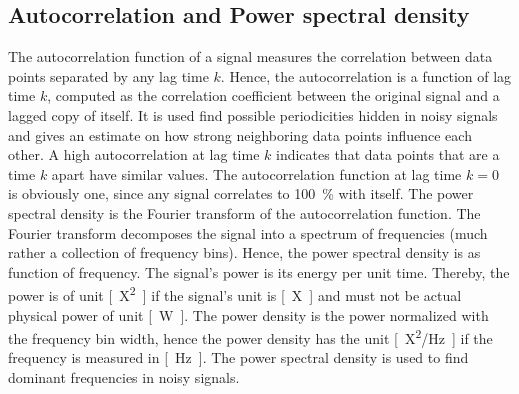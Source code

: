
    \subsection{Autocorrelation and Power spectral density} %
    \label{sub:autocorrelation_and_power_spectral_density_setup}

        The autocorrelation function of a signal measures the correlation between data points separated by any lag time $k$. Hence, the autocorrelation is a function of lag time $k$, computed as the correlation coefficient between the original signal and a lagged copy of itself. It is used find possible periodicities hidden in noisy signals and gives an estimate on how strong neighboring data points influence each other. A high autocorrelation at lag time $k$ indicates that data points that are a time $k$ apart have similar values. The autocorrelation function at lag time $k=0$ is obviously one, since any signal correlates to \SI{100}{\percent} with itself.
        The power spectral density is the Fourier transform of the autocorrelation function. The Fourier transform decomposes the signal into a spectrum of frequencies (much rather a collection of frequency bins). Hence, the power spectral density is as function of frequency. The signal's power is its energy per unit time. Thereby, the power is of unit \si{[X^2]} if the signal's unit is \si{[X]} and must not be actual physical power of unit \si{[\watt]}. The power density is the power normalized with the frequency bin width, hence the power density has the unit \si{[X^2/\hertz]} if the frequency is measured in \si{[\hertz]}. The power spectral density is used to find dominant frequencies in noisy signals.

